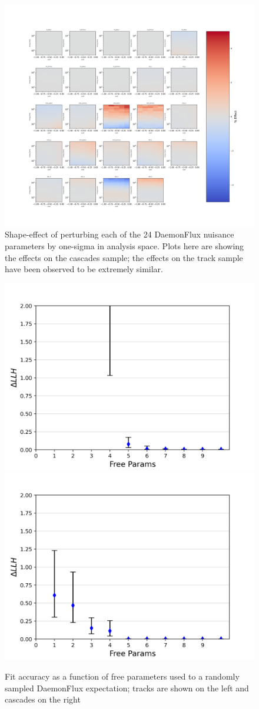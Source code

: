 \documentclass[main.tex]{subfiles}
\begin{document}
\begin{figure}
    \centering
    \includegraphics[width=0.9\linewidth]{figures/all_grads.png}
    \caption{Shape-effect of perturbing each of the 24 DaemonFlux nuisance parameters by one-sigma in analysis space. Plots here are showing the effects on the cascades sample; the effects on the track sample have been observed to be extremely similar.}\label{fig:daemon_grads}
\end{figure}

\begin{figure}
    \centering 
    \includegraphics[width=0.45\linewidth]{figures/daemon/results_track.png}%
    \includegraphics[width=0.45\linewidth]{figures/daemon/results.png}
    \caption{Fit accuracy as a function of free parameters used to a randomly sampled DaemonFlux expectation; tracks are shown on the left and cascades on the right}\label{fig:daemon_number}
\end{figure}   
\end{document}
